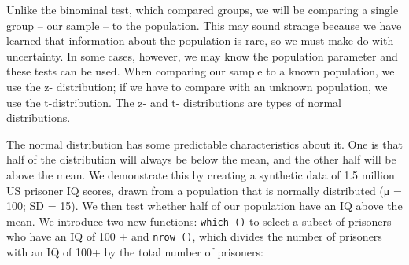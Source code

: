 \documentclass[
]{book}
\newenvironment{Shaded}{\begin{snugshade}}{\end{snugshade}}
\newcommand{\AttributeTok}[1]{\textcolor[rgb]{0.77,0.63,0.00}{#1}}
\newcommand{\CommentTok}[1]{\textcolor[rgb]{0.56,0.35,0.01}{\textit{#1}}}
\newcommand{\DecValTok}[1]{\textcolor[rgb]{0.00,0.00,0.81}{#1}}
\newcommand{\FunctionTok}[1]{\textcolor[rgb]{0.00,0.00,0.00}{#1}}
\newcommand{\NormalTok}[1]{#1}
\newcommand{\OtherTok}[1]{\textcolor[rgb]{0.56,0.35,0.01}{#1}}
\newcommand{\SpecialCharTok}[1]{\textcolor[rgb]{0.00,0.00,0.00}{#1}}
\begin{document}
Unlike the binominal test, which compared groups, we will be comparing a single group -- our sample -- to the population. This may sound strange because we have learned that information about the population is rare, so we must make do with uncertainty. In some cases, however, we may know the population parameter and these tests can be used. When comparing our sample to a known population, we use the z- distribution; if we have to compare with an unknown population, we use the t-distribution. The z- and t- distributions are types of normal distributions.

The normal distribution has some predictable characteristics about it. One is that half of the distribution will always be below the mean, and the other half will be above the mean. We demonstrate this by creating a synthetic data of 1.5 million US prisoner IQ scores, drawn from a population that is normally distributed (μ = 100; SD = 15). We then test whether half of our population have an IQ above the mean. We introduce two new functions: \texttt{which\ ()} to select a subset of prisoners who have an IQ of 100 + and \texttt{nrow\ ()}, which divides the number of prisoners with an IQ of 100+ by the total number of prisoners:

\begin{Shaded}
\end{Shaded}
\end{document}

